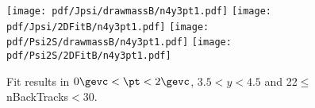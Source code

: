 \begin{figure}[H]
\begin{center}
\texttt{[image: pdf/Jpsi/drawmassB/n4y3pt1.pdf]}
\texttt{[image: pdf/Jpsi/2DFitB/n4y3pt1.pdf]}
\vspace*{-0.5cm}
\texttt{[image: pdf/Psi2S/drawmassB/n4y3pt1.pdf]}
\texttt{[image: pdf/Psi2S/2DFitB/n4y3pt1.pdf]}
\vspace*{-0.5cm}
\end{center}
\caption{Fit results in $0\gevc<\pt<2\gevc$, $3.5<y<4.5$ and 22$\leq$nBackTracks$<$30.}
\label{Fitn4y3pt1}
\end{figure}
